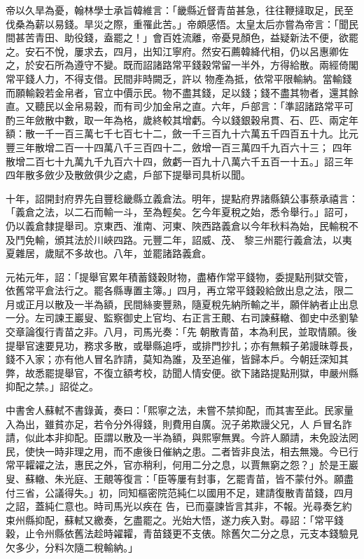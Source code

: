 \begin{pinyinscope}
 帝以久旱為憂，翰林學士承旨韓維言：「畿縣近督青苗甚急，往往鞭撻取足，民至伐桑為薪以易錢。旱災之際，重罹此苦。」帝頗感悟。太皇太后亦嘗為帝言：「聞民間甚苦青田、助役錢，盍罷之！」會百姓流離，帝憂見顏色，益疑新法不便，欲罷之。安石不悅，屢求去，四月，出知江寧府。然安石薦韓絳代相，仍以呂惠卿佐之，於安石所為遵守不變。既而詔諸路常平錢穀常留一半外，方得給散。兩經倚閣常平錢人力，不得支借。民間非時闕乏，許以
 物產為抵，依常平限輸納。當輸錢而願輸穀若金帛者，官立中價示民。物不盡其錢，足以錢；錢不盡其物者，還其餘直。又聽民以金帛易穀，而有司少加金帛之直。六年，戶部言：「準詔諸路常平可酌三年斂散中數，取一年為格，歲終較其增虧。今以錢銀穀帛貫、石、匹、兩定年額：散一千一百三萬七千七百七十二，斂一千三百九十六萬五千四百五十九。比元豐三年散增二百一十四萬八千三百四十二，斂增一百三萬四千九百六十三；
 四年散增二百七十九萬九千九百六十四，斂虧一百九十八萬六千五百一十五。」詔三年四年散多斂少及散斂俱少之處，戶部下提舉司具析以聞。



 十年，詔開封府界先自豐稔畿縣立義倉法。明年，提點府界諸縣鎮公事蔡承禧言：「義倉之法，以二石而輸一斗，至為輕矣。乞今年夏稅之始，悉令舉行。」詔可，仍以義倉隸提舉司。京東西、淮南、河東、陜西路義倉以今年秋料為始，民輸稅不及鬥免輸，頒其法於川峽四路。元豐二年，詔威、茂、
 黎三州罷行義倉法，以夷夏雜居，歲賦不多故也。八年，並罷諸路義倉。



 元祐元年，詔：「提舉官累年積蓄錢穀財物，盡樁作常平錢物，委提點刑獄交管，依舊常平倉法行之。罷各縣專置主簿。」四月，再立常平錢穀給斂出息之法，限二月或正月以散及一半為額，民間絲麥豐熟，隨夏稅先納所輸之半，願伴納者止出息一分。左司諫王巖叟、監察御史上官均、右正言王覿、右司諫蘇轍、御史中丞劉摯交章論復行青苗之非。八月，司馬光奏：「先
 朝散青苗，本為利民，並取情願。後提舉官速要見功，務求多散，或舉縣追呼，或排門抄扎；亦有無賴子弟謾昧尊長，錢不入家；亦有他人冒名詐請，莫知為誰，及至追催，皆歸本戶。今朝廷深知其弊，故悉罷提舉官，不復立額考校，訪聞人情安便。欲下諸路提點刑獄，申嚴州縣抑配之禁。」詔從之。



 中書舍人蘇軾不書錄黃，奏曰：「熙寧之法，未嘗不禁抑配，而其害至此。民家量入為出，雖貧亦足，若令分外得錢，則費用自廣。況子弟欺謾父兄，人
 戶冒名詐請，似此本非抑配。臣謂以散及一半為額，與熙寧無異。今許人願請，未免設法罔民，使快一時非理之用，而不慮後日催納之患。二者皆非良法，相去無幾。今已行常平糶糴之法，惠民之外，官亦稍利，何用二分之息，以賈無窮之怨？」於是王巖叟、蘇轍、朱光庭、王覿等復言：「臣等屢有封事，乞罷青苗，皆不蒙付外。願盡付三省，公議得失。」初，同知樞密院范純仁以國用不足，建請復散青苗錢，四月之詔，蓋純仁意也。時司馬光以疾在
 告，已而臺諫皆言其非，不報。光尋奏乞約束州縣抑配，蘇軾又繳奏，乞盡罷之。光始大悟，遂力疾入對。尋詔：「常平錢穀，止令州縣依舊法趁時糴糶，青苗錢更不支俵。除舊欠二分之息，元支本錢驗見欠多少，分料次隨二稅輸納。」




\end{pinyinscope}

